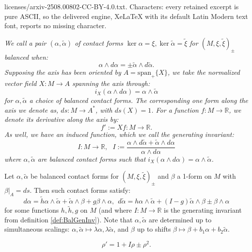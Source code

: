 \documentclass[10pt,a4paper]{amsart}
\newcommand{\R}{\mathbb{R}}
\begin{document}
licenses/arxiv-2508.00802-CC-BY-4.0.txt. Characters: every retained excerpt is pure ASCII, so the delivered engine, XeLaTeX with its default Latin Modern text font, reports no missing character.
\begin{dfn}\label{def:BalGenInv}
{\em We call a pair $(\alpha, \tilde\alpha)$ of contact forms $\ker \alpha = \xi, \ker\tilde\alpha = \tilde \xi$ for $(M, \xi, \tilde \xi)_\pm$ {\em balanced} when:
    \[ \alpha\wedge d\alpha = \pm \tilde\alpha\wedge d\tilde\alpha. \]
    Supposing the axis has been oriented by $A = \text{span}_+\{ X\}$, we take the {\em normalized vector field} $X:M\to A$ spanning the axis through:
    \[ i_X(\alpha\wedge d\alpha) = \alpha\wedge\tilde\alpha \]
    for $\alpha, \tilde\alpha$ a choice of balanced contact forms. The corresponding one form along the axis we denote as, $ds : M\to A^*$,
    with $ds(X) = 1$. For a function $f:M\to \R$, we denote its {\em derivative along the axis} by:
    \[ f' := Xf :M\to \R.\]
    As well, we have an induced function, which we call the  {\em generating invariant}:
    \[ I:M\to \R, ~~~I := \frac{\alpha\wedge d\tilde\alpha + \tilde\alpha \wedge d\alpha}{\alpha\wedge d\alpha} \]
    where $\alpha, \tilde\alpha$ are balanced contact forms such that $i_X(\alpha\wedge d\alpha) = \alpha\wedge\tilde\alpha$.}
\end{dfn}

\begin{prop}
    Let $\alpha, \tilde\alpha$ be balanced contact forms for $(M, \xi, \tilde \xi)_\pm$ and $\beta$ a 1-form on $M$ with $\beta|_A = ds$. Then such contact forms satisfy:
    \begin{equation}\label{eq:GenBalStrEq}
        d\alpha = \tilde h \alpha\wedge\tilde\alpha + \tilde\alpha\wedge \beta + g \beta\wedge\alpha , ~~d\tilde\alpha = h \alpha\wedge\tilde\alpha + (I - g )\tilde\alpha\wedge \beta \pm  \beta\wedge\alpha
    \end{equation}
    for some functions $h, \tilde h,  g$ on $M$ (and where $I:M\to\R$ is the generating invariant from definition \ref{def:BalGenInv}). Note that $\alpha, \tilde\alpha$ are determined up to simultaneous scalings: $\alpha, \tilde\alpha\mapsto \lambda\alpha, \lambda\tilde\alpha$, and $\beta$ up to shifts $\beta\mapsto \beta + b_1\alpha + b_2\tilde\alpha$.
\end{prop}

    \begin{equation}\label{eq:Ric}
        \rho' = 1 + I\rho \pm \rho^2.
    \end{equation}
\end{document}

